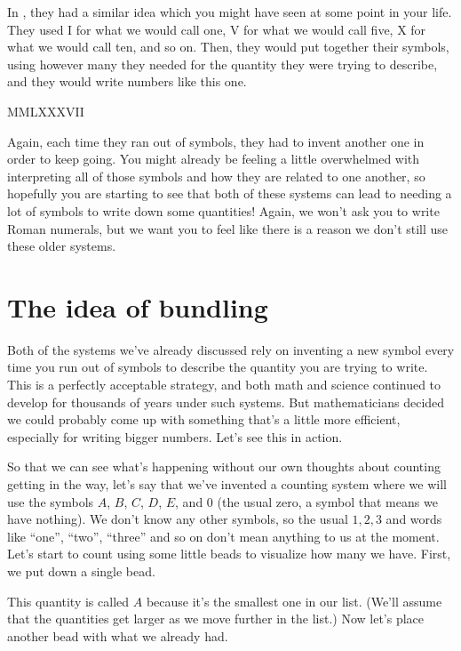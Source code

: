\documentclass{ximera}
\begin{document}
In , they had a similar idea which you might have seen at some point in your life. They used I for what we would call one, V for what we would call five, X for what we would call ten, and so on. Then, they would put together their symbols, using however many they needed for the quantity they were trying to describe, and they would write numbers like this one. 

\begin{center}
MMLXXXVII
\end{center}

Again, each time they ran out of symbols, they had to invent another one in order to keep going. You might already be feeling a little overwhelmed with interpreting all of those symbols and how they are related to one another, so hopefully you are starting to see that both of these systems can lead to needing a lot of symbols to write down some quantities! Again, we won't ask you to write Roman numerals, but we want you to feel like there is a reason we don't still use these older systems.

\section{The idea of bundling}

Both of the systems we've already discussed rely on inventing a new symbol every time you run out of symbols to describe the quantity you are trying to write. This is a perfectly acceptable strategy, and both math and science continued to develop for thousands of years under such systems. But mathematicians decided we could probably come up with something that's a little more efficient, especially for writing bigger numbers. Let's see this in action.

So that we can see what's happening without our own thoughts about counting getting in the way, let's say that we've invented a counting system where we will use the symbols $A$, $B$, $C$, $D$, $E$, and $0$ (the usual zero, a symbol that means we have nothing). We don't know any other symbols, so the usual $1, 2, 3$ and words like ``one'', ``two'', ``three'' and so on don't mean anything to us at the moment. Let's start to count using some little beads to visualize how many we have. First, we put down a single bead.

\begin{center}
\end{center}
This quantity is called $A$ because it's the smallest one in our list. (We'll assume that the quantities get larger as we move further in the list.) Now let's place another bead with what we already had.
\end{document}

